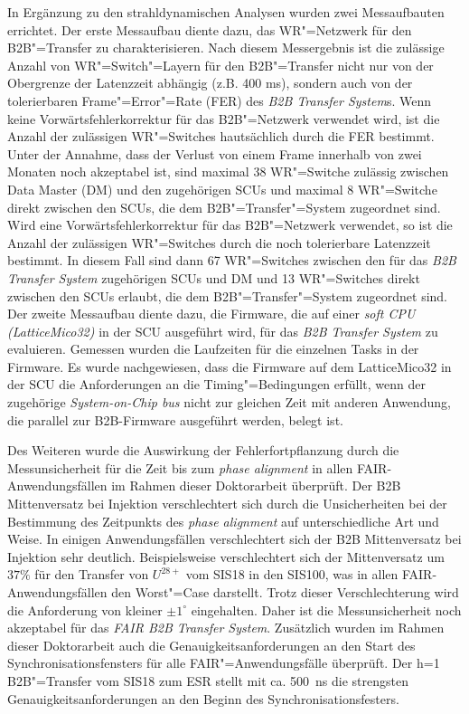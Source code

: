 In Ergänzung zu den strahldynamischen Analysen wurden zwei Messaufbauten errichtet. Der erste Messaufbau diente dazu, das WR"=Netzwerk f\"ur den B2B"=Transfer zu cha­rak­te­ri­sie­ren. Nach diesem Messergebnis ist die zul\"assige Anzahl von WR"=Switch"=Layern f\"ur den B2B"=Transfer nicht nur von der Obergrenze der Latenzzeit abh\"angig (z.B. 400 ms), sondern auch von der tolerierbaren Frame"=Error"=Rate (FER) des \textit{B2B Transfer System}s. Wenn keine Vorw\"artsfehlerkorrektur f\"ur das B2B"=Netzwerk verwendet wird, ist die Anzahl der zul\"assigen WR"=Switches hauts\"achlich durch die FER bestimmt. Unter der Annahme, dass der Verlust von einem Frame innerhalb von zwei Monaten noch akzeptabel ist, sind maximal 38 WR"=Switche zul\"assig zwischen Data Master (DM) und den zugeh\"origen SCUs und maximal 8 WR"=Switche direkt zwischen den SCUs, die dem B2B"=Transfer"=System zugeordnet sind. Wird eine Vorw\"artsfehlerkorrektur f\"ur das B2B"=Netzwerk verwendet, so ist die Anzahl der zul\"assigen WR"=Switches durch die noch tolerierbare Latenzzeit bestimmt. In diesem Fall sind dann 67 WR"=Switches zwischen den f\"ur das \textit{B2B Transfer System} zugeh\"origen SCUs  und DM und 13 WR"=Switches direkt zwischen den SCUs erlaubt, die dem B2B"=Transfer"=System zugeordnet sind. Der zweite Messaufbau diente dazu, die Firmware, die auf einer \textit{soft CPU (LatticeMico32)} in der SCU ausgef\"uhrt wird, f\"ur das \textit{B2B Transfer System} zu evaluieren. Gemessen wurden die Laufzeiten für die einzelnen Tasks in der Firmware. Es wurde nachgewiesen, dass die Firmware auf dem LatticeMico32 in der SCU die Anforderungen an die  Timing"=Bedingungen erfüllt, wenn der zugeh\"orige \textit{System-on-Chip bus} nicht zur gleichen Zeit mit anderen Anwendung, die parallel zur B2B-Firmware ausgef\"uhrt werden, belegt ist.

Des Weiteren wurde die Auswirkung der Fehlerfortpflanzung durch die Messunsicherheit f\"ur die Zeit bis zum \textit{phase alignment} in allen FAIR-Anwendungsf\"allen im Rahmen dieser Doktorarbeit überpr\"uft. Der B2B Mittenversatz bei Injektion verschlechtert sich durch die Unsicherheiten bei der Bestimmung des Zeitpunkts des \textit{phase alignment} auf unterschiedliche Art und Weise. In einigen Anwendungsfällen verschlechtert sich der B2B Mittenversatz bei Injektion sehr deutlich. Beispielsweise verschlechtert sich der Mittenversatz um $37\%$ f\"ur den Transfer von $U^\mathit{28+}$  vom SIS18 in den SIS100, was in allen FAIR-Anwendungsf\"allen den Worst"=Case darstellt. Trotz dieser Verschlechterung wird die Anforderung von kleiner $\pm1^\circ$ eingehalten. Daher ist die Messunsicherheit noch akzeptabel für das \textit{FAIR B2B Transfer System}. Zus\"atzlich wurden im Rahmen dieser Doktorarbeit auch die Genauigkeitsanforderungen an den Start des Synchronisationsfensters f\"ur alle FAIR"=Anwendungsf\"alle \"uberpr\"uft. Der h=1 B2B"=Transfer vom SIS18 zum ESR stellt mit ca. \SI{500}{\ns} die strengsten Genauigkeitsanforderungen an den Beginn des Synchronisationsfesters. 

